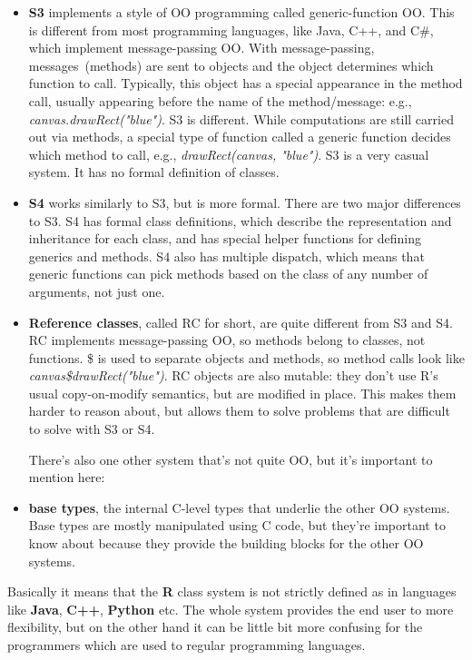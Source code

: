 \documentclass[thesis=M,english]{FITthesis}[2018/10/20]
\begin{document}
\begin{itemize}
\item \textbf{S3} implements a style of OO programming called generic-function OO. This is different from most programming languages, like Java, C++, and C{\#}, which implement message-passing OO. With message-passing, messages~(methods) are sent to objects and the object determines which function to call. Typically, this object has a special appearance in the method call, usually appearing before the name of the method/message: e.g., \textit{canvas.drawRect("blue")}. S3 is different. While computations are still carried out via methods, a special type of function called a generic function decides which method to call, e.g., \textit{drawRect(canvas, "blue")}. S3 is a very casual system. It has no formal definition of classes.

\item \textbf{S4} works similarly to S3, but is more formal. There are two major differences to S3. S4 has formal class definitions, which describe the representation and inheritance for each class, and has special helper functions for defining generics and methods. S4 also has multiple dispatch, which means that generic functions can pick methods based on the class of any number of arguments, not just one.

\item \textbf{Reference classes}, called RC for short, are quite different from S3 and S4. RC implements message-passing OO, so methods belong to classes, not functions. {\$} is used to separate objects and methods, so method calls look like \textit{canvas{\$}drawRect("blue")}. RC objects are also mutable: they don't use R's usual copy-on-modify semantics, but are modified in place. This makes them harder to reason about, but allows them to solve problems that are difficult to solve with S3 or S4.


There's also one other system that's not quite OO, but it's important to mention here:


\item \textbf{base types}, the internal C-level types that underlie the other OO systems. Base types are mostly manipulated using C code, but they're important to know about because they provide the building blocks for the other OO systems.
\end{itemize}

Basically it means that the \textbf{R} class system is not strictly defined as in languages like \textbf{Java}, \textbf{C++}, \textbf{Python} etc. The whole system provides the end user to more flexibility, but on the other hand it can be little bit more confusing for the programmers which are used to regular programming languages.
\end{document}
